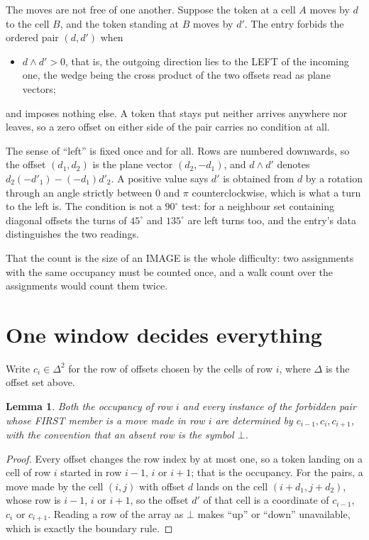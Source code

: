 \documentclass[11pt,a4paper]{article}
\theoremstyle{plain}
\newtheorem{lemma}[theorem]{Lemma}
\theoremstyle{definition}
\begin{document}
The moves are not free of one another. Suppose the token at a cell $A$ moves by $d$ to the
cell $B$, and the token standing at $B$ moves by $d'$. The entry forbids the ordered pair
$(d,d')$ when
\begin{itemize}
\item $d\wedge d'>0$, that is, the outgoing direction lies to the LEFT of the incoming one, the wedge being the cross product of the two offsets read as plane vectors;
\end{itemize}
and imposes nothing else. A token that stays put neither arrives anywhere nor leaves, so a
zero offset on either side of the pair carries no condition at all.

The sense of ``left'' is fixed once and for all. Rows are numbered downwards, so the offset
$(d_1,d_2)$ is the plane vector $(d_2,-d_1)$, and $d\wedge d'$ denotes
$d_2(-d'_1)-(-d_1)d'_2$. A positive value says $d'$ is obtained from $d$ by a rotation through
an angle strictly between $0$ and $\pi$ counterclockwise, which is what a turn to the left is.
The condition is not a $90^\circ$ test: for a neighbour set containing diagonal offsets the
turns of $45^\circ$ and $135^\circ$ are left turns too, and the entry's data distinguishes the
two readings.

That the count is the size of an IMAGE is the whole difficulty: two assignments with the same
occupancy must be counted once, and a walk count over the assignments would count them twice.

\section{One window decides everything}

Write $c_i\in\Delta^{2}$ for the row of offsets chosen by the cells of row $i$, where
$\Delta$ is the offset set above.

\begin{lemma}\label{lem:win}
Both the occupancy of row $i$ and every instance of the forbidden pair whose FIRST member is a
move made in row $i$ are determined by $c_{i-1},c_i,c_{i+1}$, with the convention that an
absent row is the symbol $\bot$.
\end{lemma}

\begin{proof}
Every offset changes the row index by at most one, so a token landing on a cell of row $i$
started in row $i-1$, $i$ or $i+1$; that is the occupancy. For the pairs, a move made by the
cell $(i,j)$ with offset $d$ lands on the cell $(i+d_1,j+d_2)$, whose row is $i-1$, $i$ or
$i+1$, so the offset $d'$ of that cell is a coordinate of $c_{i-1}$, $c_i$ or $c_{i+1}$.
Reading a row of the array as $\bot$ makes ``up'' or ``down'' unavailable, which is exactly
the boundary rule.
\end{proof}
\end{document}
